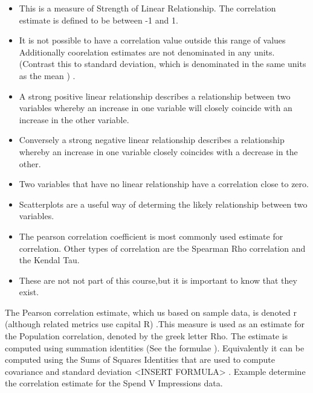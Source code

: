 \documentclass[]{report}
\begin{document}
		\begin{itemize}
			\item This is a measure of Strength of Linear Relationship. 
			The correlation estimate is defined to be between -1 and 1. 
			\item It is not possible to have a correlation value outside this range of values
			Additionally coorelation estimates are not denominated in any units. (Contrast this to standard deviation, which is denominated in the same units as the mean ) .
			\item A strong positive linear relationship describes a relationship between two variables whereby an increase in one variable will closely coincide with an increase in the other variable. 
			\item Conversely a strong negative linear relationship describes a relationship whereby an increase in one variable closely coincides with a decrease in the other. 
		\end{itemize}
\begin{itemize}
			\item  Two variables that have no linear relationship have a correlation close to zero. 
			
			\item Scatterplots are a useful way of determing the likely relationship between two variables. 
			
			\item The pearson correlation coefficient is most commonly used estimate for correlation. Other types of correlation are tbe Spearman Rho correlation and the Kendal Tau. 
			
			\item  These are not not part of this course,but it is important to know that they exist. 
		\end{itemize}
		
		
		
		
		The Pearson correlation estimate, which us based on sample data, is denoted r (although related metrics use capital R) .This measure is used as an estimate for the Population correlation, denoted by the greek letter Rho. 
		The estimate is computed using summation identities (See the formulae ). 
		Equivalently it can be computed using the  Sums of Squares Identities that are used to compute covariance and standard deviation <INSERT FORMULA> .
		Example
		determine the correlation estimate for the Spend V Impressions data.  
		
\end{document}
